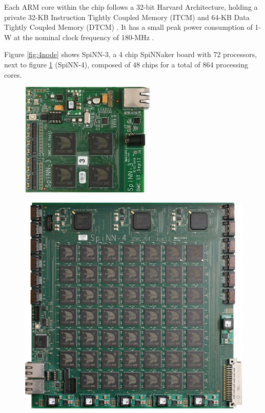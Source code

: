 Each ARM core within the chip follows a 32-bit Harvard Architecture, holding a private 32-KB Instruction Tightly Coupled Memory (ITCM) and 64-KB Data Tightly Coupled Memory (DTCM) \cite{painkras}. It has a small peak power consumption of 1-W at the nominal clock frequency of 180-MHz \cite{arm968}.

Figure \ref{fig:4node} shows SpiNN-3, a 4 chip SpiNNaker board with 72 processors, next to figure \ref{fig:48node} (SpiNN-4), composed of 48 chips for a total of 864 processing cores.

\begin{figure}
\centering
\begin{minipage}{.5\textwidth}
  \centering
  \includegraphics[width=0.4\linewidth, natwidth=245, natheight=205]{images/4node.jpg}
  \label{fig:4node}
\end{minipage}%
\begin{minipage}{.5\textwidth}
  \centering
  \includegraphics[width=0.9\linewidth, natwidth=945, natheight=896]{images/48node.jpg}
  \label{fig:48node}
\end{minipage}
\end{figure}

